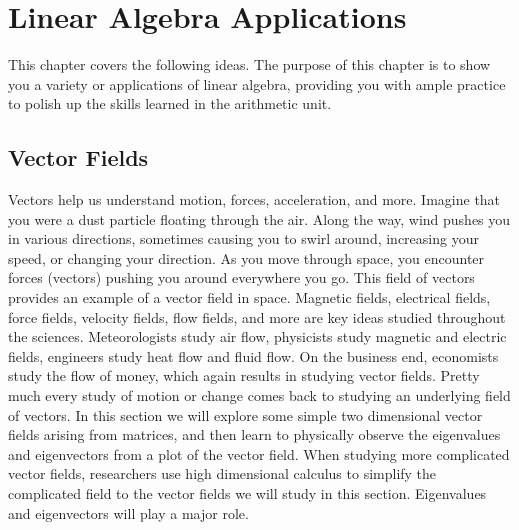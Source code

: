 
\chapter{Linear Algebra Applications}

This chapter covers the following ideas.  The purpose of this chapter is to show you a variety or applications of linear algebra, providing you with ample practice to polish up the skills learned in the arithmetic unit.  






\section{Vector Fields}



Vectors help us understand motion, forces, acceleration, and more. Imagine that you were a dust particle floating through the air.  Along the way, wind pushes you in various directions, sometimes causing you to swirl around, increasing your speed, or changing your direction. As you move through space, you encounter forces (vectors) pushing you around everywhere you go. This field of vectors provides an example of a vector field in space.  Magnetic fields, electrical fields, force fields, velocity fields, flow fields, and more are key ideas studied throughout the sciences. Meteorologists study air flow, physicists study magnetic and electric fields, engineers study heat flow and fluid flow. On the business end, economists study the flow of money, which again results in studying vector fields. Pretty much every study of motion or change comes back to studying an underlying field of vectors.  In this section we will explore some simple two dimensional vector fields arising from matrices, and then learn to physically observe the eigenvalues and eigenvectors from a plot of the vector field.  When studying more complicated vector fields, researchers use high dimensional calculus to simplify the complicated field to the vector fields we will study in this section. Eigenvalues and eigenvectors will play a major role.

